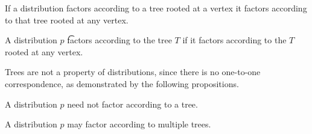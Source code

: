 \begin{prop}
If a distribution factors according to a tree rooted at a vertex it factors according to that tree rooted at any vertex.
\end{prop}


A distribution $p$
\t{factors according to the tree}{} $T$
if it factors according to the
$T$ rooted at any vertex.


Trees are not a property of distributions,
since there is no one-to-one correspondence,
as demonstrated by the following propositions.


A distribution $p$ need not factor according to a tree.

A distribution
$p$ may factor according to multiple trees.
\strats
